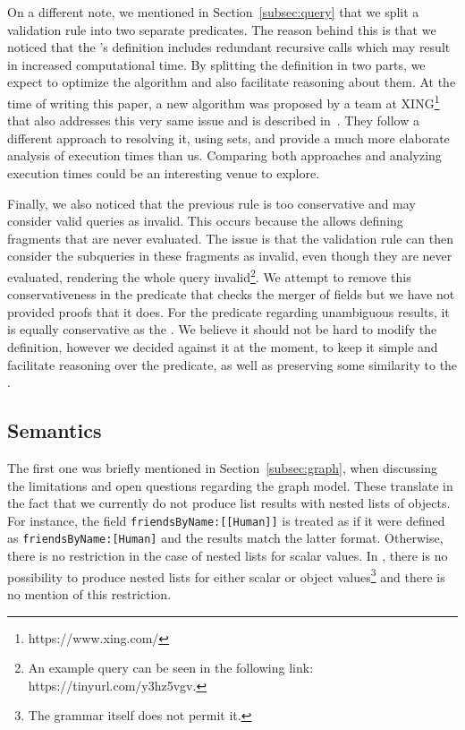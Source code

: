 On a different note, we mentioned in Section~\ref{subsec:query} that we split a validation rule into two separate predicates. The reason behind this is that we noticed that the \spec's definition includes redundant recursive calls which may result in increased computational time. By splitting the definition in two parts, we expect to optimize the algorithm and also facilitate reasoning about them. At the time of writing this paper, a new algorithm was proposed by a team at XING\footnote{https://www.xing.com/} that also addresses this very same issue and is described in~\cite{xingalg}. They follow a different approach to resolving it, using sets, and provide a much more elaborate analysis of execution times than us. Comparing both approaches and analyzing execution times could be an interesting venue to explore.

Finally, we also noticed that the previous rule is too conservative and may consider valid queries as invalid. This occurs because the \spec allows defining fragments that are never evaluated. The issue is that the validation rule can then consider the subqueries in these fragments as invalid, even though they are never evaluated, rendering the whole query invalid\footnote{An example query can be seen in the following link: https://tinyurl.com/y3hz5vgv.}. We attempt to remove this conservativeness in the predicate that checks the merger of fields but we have not provided proofs that it does. For the predicate regarding unambiguous results, it is equally conservative as the \spec. We believe it should not be hard to modify the definition, however we decided against it at the moment, to keep it simple and facilitate reasoning over the predicate, as well as preserving some similarity to the \spec{}.


\subsection{Semantics}


The first one was briefly mentioned in Section~\ref{subsec:graph}, when discussing the limitations and open questions regarding the graph model. These translate in the fact that we currently do not produce list results with nested lists of objects. For instance, the field \texttt{friendsByName:[[Human]]} is treated as if it were defined as \texttt{friendsByName:[Human]} and the results match the latter format. Otherwise, there is no restriction in the case of nested lists for scalar values. In \HP, there is no possibility to produce nested lists for either scalar or object values\footnote{The grammar itself does not permit it.} and there is no mention of this restriction.


